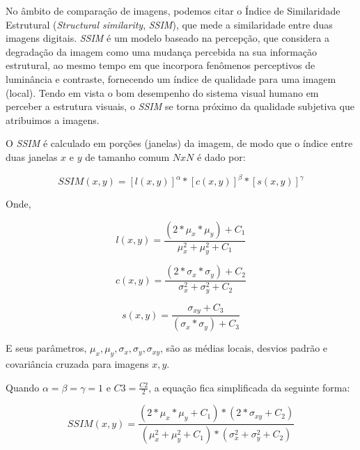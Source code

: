 No âmbito de comparação de imagens, podemos citar o Índice de Similaridade Estrutural (\textit{Structural similarity}, \textit{SSIM}), que mede a similaridade entre duas imagens digitais. \textit{SSIM} é um modelo baseado na percepção, que considera a degradação da imagem como uma mudança percebida na sua informação estrutural, ao mesmo tempo em que incorpora fenômenos perceptivos de luminância e contraste, fornecendo um índice de qualidade para uma imagem (local). Tendo em vista o bom desempenho do sistema visual humano \cite{61} em perceber a estrutura visuais, o \textit{SSIM} se torna próximo da qualidade subjetiva que atribuimos a imagens.

O \textit{SSIM} é calculado em porções (janelas) da imagem, de modo que o índice entre duas janelas $x$ e $y$ de tamanho comum $NxN$ é dado por:

\begin{equation}
    SSIM(x,y) = [l(x,y)]^\alpha * [c(x,y)]^\beta * [s(x,y)]^\gamma
\end{equation}

Onde,

\begin{equation}
    l(x,y) = \frac{(2 * \mu_x * \mu_y) + C_1}{\mu_x^2 + \mu_y^2 + C_1}
\end{equation}

\begin{equation}
    c(x,y) = \frac{(2 * \sigma_x * \sigma_y) + C_2}{\sigma_x^2 + \sigma_y^2 + C_2}
\end{equation}

\begin{equation}
    s(x,y) = \frac{\sigma_{xy} + C_3}{(\sigma_x * \sigma_y) + C_3}
\end{equation}

E seus parâmetros, $\mu_x, \mu_y, \sigma_x, \sigma_y, \sigma_{xy}$, são as médias locais, desvios padrão e covariância cruzada para imagens $x, y$.

Quando $\alpha = \beta = \gamma = 1$ e $C3 = \frac{C2}{2}$, a equação fica simplificada da seguinte forma:

\begin{equation}
    SSIM(x,y) = \frac{(2 * \mu_x * \mu_y + C_1) * (2 * \sigma_{xy} + C_2)}{(\mu_x^2 + \mu_y^2 + C_1) * (\sigma_x^2 + \sigma_y^2 + C_2)}
\end{equation}

